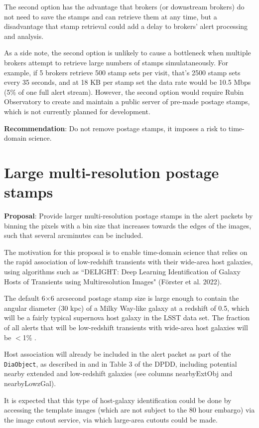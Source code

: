 \documentclass[DM,authoryear,toc]{lsstdoc}
\begin{document}
The second option has the advantage that brokers (or downstream brokers) do not need to save the stamps and can retrieve 
them at any time, but a disadvantage that stamp retrieval could add a delay to brokers' alert processing and analysis.

As a side note, the second option is unlikely to cause a bottleneck when multiple brokers attempt to retrieve large numbers 
of stamps simulataneously.
For example, if 5 brokers retrieve 500 stamp sets per visit, that's 2500 stamp sets every 35 seconds, and at 18 KB 
per stamp set the data rate would be 10.5 Mbps (5\% of one full alert stream).
However, the second option would require Rubin Observatory to create and maintain a public server of 
pre-made postage stamps, which is not currently planned for development.

\textbf{Recommendation}: Do not remove postage stamps, it imposes a risk to time-domain science.


\section{Large multi-resolution postage stamps}\label{sec:bigstamps}

\textbf{Proposal}: Provide larger multi-resolution postage stamps in the alert packets by binning 
the pixels with a bin size that increases towards the edges of the images, such that several 
arcminutes can be included.

The motivation for this proposal is to enable time-domain science that relies on the rapid association 
of low-redshift transients with their wide-area host galaxies, using algorithms such as 
``DELIGHT: Deep Learning Identification of Galaxy Hosts of Transients using Multiresolution Images" (Förster et al. 2022).

The default 6$\times$6 arcsecond postage stamp size is large enough to contain the angular diameter (30 kpc) 
of a Milky Way-like galaxy at a redshift of 0.5, which will be a fairly typical supernova host galaxy in the LSST data set.
The fraction of all alerts that will be low-redshift transients with wide-area host galaxies will be $<$1\% .

Host association will already be included in the alert packet as part of the \texttt{DiaObject}, as described in  
and in Table 3 of the DPDD, including potential nearby extended and low-redshift galaxies (see columns nearbyExtObj and nearbyLowzGal).

It is expected that this type of host-galaxy identification could be done by accessing the template images 
(which are not subject to the 80 hour embargo) via the image cutout service, via which large-area cutouts could be made.
\end{document}
